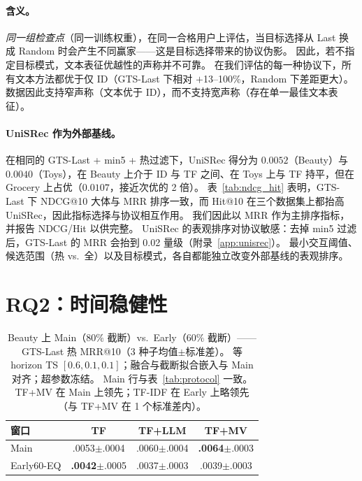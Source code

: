 \documentclass[sigconf,natbib=true,anonymous]{acmart}
\newcommand{\tfidf}{\textsc{TF-IDF}\xspace}
\newcommand{\tfmv}{\textsc{TF+MV}\xspace}
\begin{document}
\paragraph{含义。}
\emph{同一组检查点}（同一训练权重），在同一合格用户上评估，当目标选择从 Last 换成 Random 时会产生不同赢家——这是目标选择带来的协议伪影。
因此，若不指定目标模式，文本表征优越性的声称并不可靠。
在我们评估的每一种协议下，所有文本方法都优于仅 ID（GTS-Last 下相对 $+$13--100\%，Random 下差距更大）。
数据因此支持窄声称（文本优于 ID），而不支持宽声称（存在单一最佳文本表征）。

\paragraph{UniSRec 作为外部基线。}
在相同的 GTS-Last + min5 + 热过滤下，UniSRec 得分为 $0.0052$（Beauty）与 $0.0040$（Toys），在 Beauty 上介于 ID 与 TF 之间、在 Toys 上与 TF 持平，但在 Grocery 上占优（$0.0107$，接近次优的 2 倍）。
表~\ref{tab:ndcg_hit} 表明，GTS-Last 下 NDCG@10 大体与 MRR 排序一致，而 Hit@10 在三个数据集上都抬高 UniSRec，因此指标选择与协议相互作用。
我们因此以 MRR 作为主排序指标，并报告 NDCG/Hit 以供完整。
UniSRec 的表观排序对协议敏感：去掉 min5 过滤后，GTS-Last 的 MRR 会抬到 0.02 量级（附录~\ref{app:unisrec}）。
最小交互阈值、候选范围（热 vs.\ 全）以及目标模式，各自都能独立改变外部基线的表观排序。

\section{RQ2：时间稳健性}
\label{sec:rq2}

\begin{table}[t]
\centering
\caption{%
Beauty 上 Main（$80\%$ 截断）vs.\ Early（$60\%$ 截断）——GTS-Last 热 MRR@10（3 种子均值$\pm$标准差）。
等 horizon TS $[0.6,0.1,0.1]$；融合与截断拟合嵌入与 Main 对齐；超参数冻结。
Main 行与表~\ref{tab:protocol} 一致。
\tfmv 在 Main 上领先；\tfidf 在 Early 上略领先（与 \tfmv 在 1 个标准差内）。%
}
\label{tab:early}
\small
\begin{tabular}{@{}lccc@{}}
\toprule
窗口 & TF & TF+LLM & TF+MV \\
\midrule
Main      & .0053\tiny{$\pm$.0004} & .0060\tiny{$\pm$.0004} & \textbf{.0064}\tiny{$\pm$.0003} \\
Early60-EQ & \textbf{.0042}\tiny{$\pm$.0005} & .0037\tiny{$\pm$.0003} & .0039\tiny{$\pm$.0003} \\
\bottomrule
\end{tabular}
\end{table}
\end{document}
